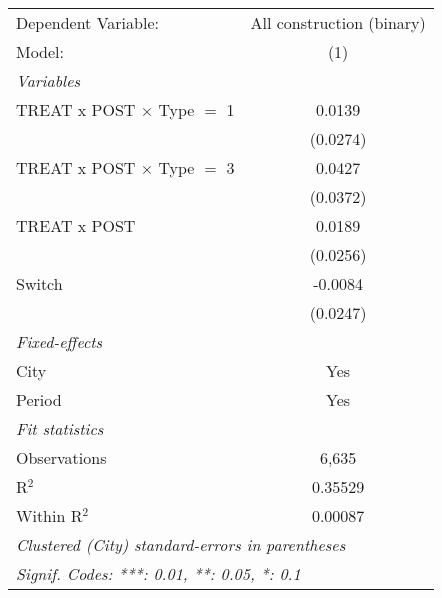 \begingroup
\centering
\begin{tabular}{lc}
   \tabularnewline \midrule \midrule
   Dependent Variable:               & All construction (binary)\\  
   Model:                            & (1)\\  
   \midrule
   \emph{Variables}\\
   TREAT x POST $\times$ Type $=$ 1  & 0.0139\\   
                                     & (0.0274)\\   
   TREAT x POST $\times$ Type $=$ 3  & 0.0427\\   
                                     & (0.0372)\\   
   TREAT x POST                      & 0.0189\\   
                                     & (0.0256)\\   
   Switch                            & -0.0084\\   
                                     & (0.0247)\\   
   \midrule
   \emph{Fixed-effects}\\
   City                              & Yes\\  
   Period                            & Yes\\  
   \midrule
   \emph{Fit statistics}\\
   Observations                      & 6,635\\  
   R$^2$                             & 0.35529\\  
   Within R$^2$                      & 0.00087\\  
   \midrule \midrule
   \multicolumn{2}{l}{\emph{Clustered (City) standard-errors in parentheses}}\\
   \multicolumn{2}{l}{\emph{Signif. Codes: ***: 0.01, **: 0.05, *: 0.1}}\\
\end{tabular}
\par\endgroup
